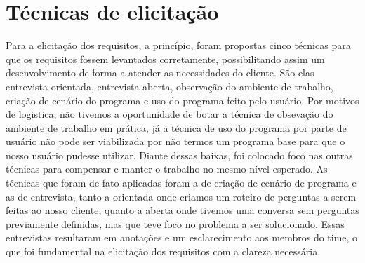 \chapter{Técnicas de elicitação}

Para a elicitação dos requisitos, a princípio, foram propostas cinco técnicas para que os requisitos fossem levantados corretamente, possibilitando assim um desenvolvimento de forma a atender as necessidades do cliente. São elas entrevista orientada, entrevista aberta, observação do ambiente de trabalho, criação de cenário do programa e uso do programa feito pelo usuário.
Por motivos de logistica, não tivemos a oportunidade de botar a técnica de obsevação do ambiente de trabalho em prática, já a técnica de uso do programa por parte de usuário não pode ser viabilizada por não termos um programa base para que o nosso usuário pudesse utilizar. Diante dessas baixas, foi colocado foco nas outras técnicas para compensar e manter o trabalho no mesmo nível esperado.
As técnicas que foram de fato aplicadas foram a de criação de cenário de programa e as de entrevista, tanto a orientada onde criamos um roteiro de perguntas a serem feitas ao nosso cliente, quanto a aberta onde tivemos uma conversa sem perguntas previamente definidas, mas que teve foco no problema a ser solucionado. Essas entrevistas resultaram em anotações e um esclarecimento aos membros do time, o que foi fundamental na elicitação dos requisitos com a clareza necessária.